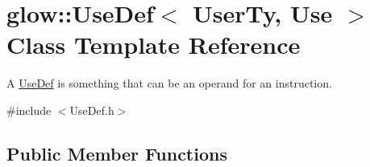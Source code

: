\hypertarget{classglow_1_1_use_def}{}\section{glow\+:\+:Use\+Def$<$ User\+Ty, Use $>$ Class Template Reference}
\label{classglow_1_1_use_def}


A \hyperlink{classglow_1_1_use_def}{Use\+Def} is something that can be an operand for an instruction.  




{\ttfamily \#include $<$Use\+Def.\+h$>$}

\subsection*{Public Member Functions}
